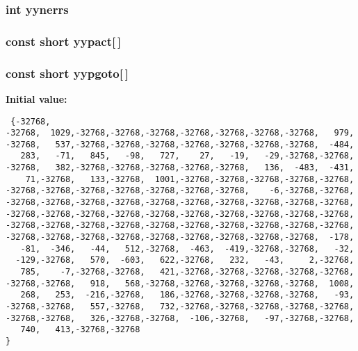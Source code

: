 \subsubsection{\setlength{\rightskip}{0pt plus 5cm}int yynerrs}\label{parser_8c_a203}


\subsubsection{\setlength{\rightskip}{0pt plus 5cm}const short yypact[$\,$]\hspace{0.3cm}{\tt  [static]}}\label{parser_8c_a196}


\subsubsection{\setlength{\rightskip}{0pt plus 5cm}const short yypgoto[$\,$]\hspace{0.3cm}{\tt  [static]}}\label{parser_8c_a197}


{\bf Initial value:}

\footnotesize\begin{verbatim} {-32768,
-32768,  1029,-32768,-32768,-32768,-32768,-32768,-32768,-32768,   979,
-32768,   537,-32768,-32768,-32768,-32768,-32768,-32768,-32768,  -484,
   283,   -71,   845,   -98,   727,    27,   -19,   -29,-32768,-32768,
-32768,   382,-32768,-32768,-32768,-32768,-32768,   136,  -483,  -431,
    71,-32768,   133,-32768,  1001,-32768,-32768,-32768,-32768,-32768,
-32768,-32768,-32768,-32768,-32768,-32768,-32768,    -6,-32768,-32768,
-32768,-32768,-32768,-32768,-32768,-32768,-32768,-32768,-32768,-32768,
-32768,-32768,-32768,-32768,-32768,-32768,-32768,-32768,-32768,-32768,
-32768,-32768,-32768,-32768,-32768,-32768,-32768,-32768,-32768,-32768,
-32768,-32768,-32768,-32768,-32768,-32768,-32768,-32768,-32768,  -178,
   -81,  -346,   -44,   512,-32768,  -463,  -419,-32768,-32768,   -32,
  -129,-32768,   570,  -603,   622,-32768,   232,   -43,     2,-32768,
   785,    -7,-32768,-32768,   421,-32768,-32768,-32768,-32768,-32768,
-32768,-32768,   918,   568,-32768,-32768,-32768,-32768,-32768,  1008,
   268,   253,  -216,-32768,   186,-32768,-32768,-32768,-32768,   -93,
-32768,-32768,   557,-32768,   732,-32768,-32768,-32768,-32768,-32768,
-32768,-32768,   326,-32768,-32768,  -106,-32768,   -97,-32768,-32768,
   740,   413,-32768,-32768
}\end{verbatim}\normalsize 
{}
